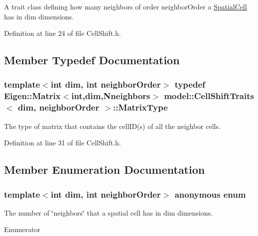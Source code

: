 A trait class defining how many neighbors of order neighbor\+Order a \hyperlink{structmodel_1_1_spatial_cell}{Spatial\+Cell} has in dim dimensions. 

Definition at line 24 of file Cell\+Shift.\+h.



\subsection{Member Typedef Documentation}
\hypertarget{structmodel_1_1_cell_shift_traits_a1d6b1b4457ac8912cf28783f40c344a3}{}
\subsubsection[{Matrix\+Type}]{\setlength{\rightskip}{0pt plus 5cm}template$<$int dim, int neighbor\+Order$>$ typedef Eigen\+::\+Matrix$<$int,{\bf dim},{\bf Nneighbors}$>$ {\bf model\+::\+Cell\+Shift\+Traits}$<$ {\bf dim}, neighbor\+Order $>$\+::{\bf Matrix\+Type}}\label{structmodel_1_1_cell_shift_traits_a1d6b1b4457ac8912cf28783f40c344a3}


The type of matrix that contains the cell\+I\+D(s) of all the neighbor cells. 



Definition at line 31 of file Cell\+Shift.\+h.



\subsection{Member Enumeration Documentation}
\hypertarget{structmodel_1_1_cell_shift_traits_ad08d385061a729c0cb44dbcfbd516b75}{}\subsubsection[{anonymous enum}]{\setlength{\rightskip}{0pt plus 5cm}template$<$int dim, int neighbor\+Order$>$ anonymous enum}\label{structmodel_1_1_cell_shift_traits_ad08d385061a729c0cb44dbcfbd516b75}


The number of \char`\"{}neighbors\char`\"{} that a spatial cell has in dim dimensions. 

\begin{Desc}
\item[Enumerator]\par
\begin{description}
\item[{\em 
\hypertarget{structmodel_1_1_cell_shift_traits_ad08d385061a729c0cb44dbcfbd516b75a786ab6aa5e0cb1e579485e93d8d91f13}{}Nneighbors\label{structmodel_1_1_cell_shift_traits_ad08d385061a729c0cb44dbcfbd516b75a786ab6aa5e0cb1e579485e93d8d91f13}
}]\end{description}
\end{Desc}


